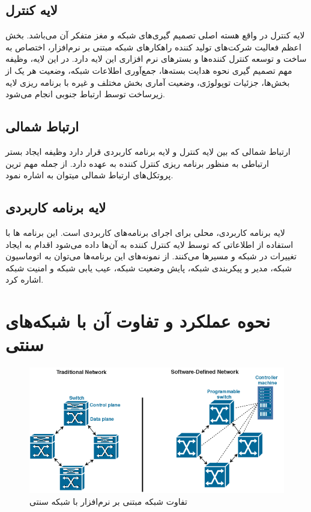 \subsection{لایه کنترل}
لایه کنترل در واقع هسته اصلی تصمیم گیری‌های شبکه و مغز متفکر آن می‌باشد. بخش اعظم فعالیت شرکت‌های تولید کننده‌ راهکار‌های شبکه‌ مبتنی بر نرم‌افزار، اختصاص به ساخت و توسعه کنترل کننده‌ها و بستر‌های نرم افزاری این لایه دارد. در این لایه، وظیفه مهم تصمیم گیری نحوه هدایت بسته‌ها، جمع‌آوری اطلاعات شبکه، وضعیت هر یک از بخش‌ها، جزئیات توپولوژی، وضعیت آماری بخش مختلف و غیره با برنامه ریزی لایه زیرساخت توسط ارتباط جنوبی انجام می‌شود.

\subsection{ارتباط شمالی}
ارتباط شمالی که بین لایه کنترل و لایه برنامه کاربردی قرار دارد وظیفه ایجاد بستر ارتباطی به منظور برنامه ریزی کنترل کننده به عهده دارد. از جمله مهم ترین پروتکل‌های ارتباط شمالی میتوان به  اشاره نمود.

\subsection{لایه برنامه کاربردی}
لایه برنامه کاربردی، محلی برای اجرای برنامه‌های کاربردی است. این برنامه ها با استفاده از اطلاعاتی که توسط لایه کنترل کننده به آن‌ها داده می‌شود اقدام به ایجاد تغییرات در شبکه و مسیر‌ها می‌کنند. از نمونه‌های این برنامه‌ها می‌توان به اتوماسیون شبکه، مدیر و پیکربندی شبکه، پایش وضعیت شبکه، عیب یابی شبکه و امنیت شبکه اشاره کرد.

\section{نحوه عملکرد و تفاوت آن با شبکه‌های سنتی}

\begin{figure}
	\centering
	\includegraphics[scale=0.3]{imgs/sdn_vs_trad.png}
	\caption{تفاوت شبکه مبتنی بر نرم‌افزار با شبکه سنتی}
	\label{fig3}
\end{figure}

